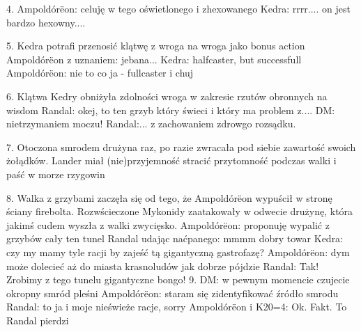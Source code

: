 \documentclass[10pt,twoside,twocolumn]{book}
\begin{document}
4. Ampoldórëon: celuję w tego oświetlonego i zhexowanego
Kedra: rrrr.... on jest bardzo hexowny....

5. Kedra potrafi przenosić klątwę z wroga na wroga jako bonus action
Ampoldórëon z uznaniem: jebana...
Kedra: halfcaster, but successfull
Ampoldórëon: nie to co ja - fullcaster i chuj

6. Klątwa Kedry obniżyła zdolności wroga w zakresie rzutów obronnych na wisdom
Randal: okej, to ten grzyb który świeci i który ma problem z....
DM: nietrzymaniem moczu!
Randal:... z zachowaniem zdrowgo rozsądku.

7. Otoczona smrodem drużyna raz, po razie zwracała pod siebie zawartość swoich żołądków. Lander miał (nie)przyjemność stracić przytomność podczas walki i paść w morze rzygowin

8. Walka z grzybami zaczęła się od tego, że Ampoldórëon wypuścił w stronę ściany firebolta. Rozwścieczone Mykonidy zaatakowały w odwecie drużynę, która jakimś cudem wyszła z walki zwycięsko.
Ampoldórëon: proponuję wypalić z grzybów cały ten tunel
Randal udając naćpanego: mmmm dobry towar
Kedra: czy my mamy tyle racji by zajeść tą gigantyczną gastrofazę?
Ampoldórëon: dym może dolecieć aż do miasta krasnoludów jak dobrze pójdzie
Randal: Tak! Zrobimy z tego tunelu gigantyczne bongo!
9. DM: w pewnym momencie czujecie okropny smród pleśni
Ampoldórëon: staram się zidentyfikować źródło smrodu
Randal: to ja i moje nieświeże racje, sorry
Ampoldórëon i K20=4: Ok. Fakt. To Randal pierdzi
\end{document}
